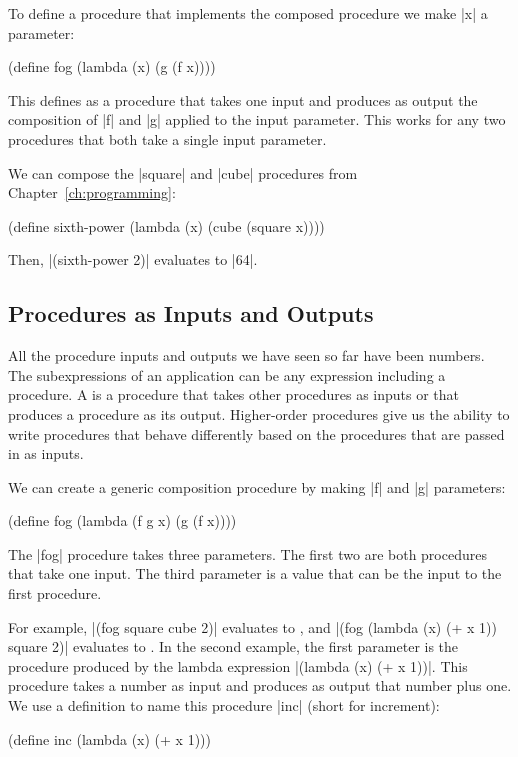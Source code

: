 \begin{schemeregion}
To define a procedure that implements the composed procedure we make \scheme|x| a parameter:
\begin{schemedisplay}
(define fog (lambda (x) (g (f x))))
\end{schemedisplay}
This defines  as a procedure that takes one input and produces as output the composition of \scheme|f| and \scheme|g| applied to the input parameter.  This works for any two procedures that both take a single input parameter.

We can compose the \scheme|square| and \scheme|cube| procedures from Chapter~\ref{ch:programming}:
\begin{schemedisplay}
(define sixth-power (lambda (x) (cube (square x))))
\end{schemedisplay}
Then, \scheme|(sixth-power 2)| evaluates to \schemeresult|64|.  

\subsection{Procedures as Inputs and Outputs}\label{sec:fcompose}

All the procedure inputs and outputs we have seen so far have been numbers.  The subexpressions of an application can be any expression including a procedure.  A  is a procedure that takes other procedures as inputs or that produces a procedure as its output.  Higher-order procedures give us the ability to write procedures that behave differently based on the procedures that are passed in as inputs.  

We can create a generic composition procedure by making \scheme|f| and \scheme|g| parameters:
\begin{schemedisplay}
(define fog (lambda (f g x) (g (f x))))
\end{schemedisplay}
The \scheme|fog| procedure takes three parameters.  The first two are both procedures that take one input.  The third parameter is a value that can be the input to the first procedure.

For example, \scheme|(fog square cube 2)| evaluates to , and  \scheme|(fog (lambda (x) (+ x 1)) square 2)| evaluates to .  In the second example, the first parameter is the procedure produced by the lambda expression \scheme|(lambda (x) (+ x 1))|.  This procedure takes a number as input and produces as output that number plus one.  We use a definition to name this procedure \scheme|inc| (short for increment):
\begin{schemedisplay}
(define inc (lambda (x) (+ x 1)))
\end{schemedisplay}


\end{schemeregion}
